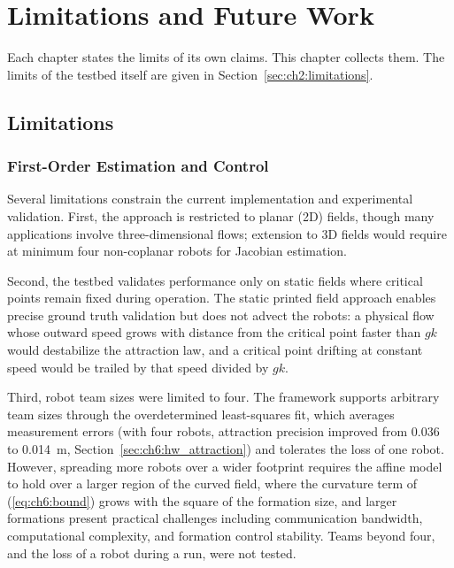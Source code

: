 \chapter{Limitations and Future Work}
\label{ch:limitations}

Each chapter states the limits of its own claims. This chapter collects
them. The limits of the testbed itself are given in
Section~\ref{sec:ch2:limitations}.

\section{Limitations}
\label{sec:ch9:limitations}

\subsection{First-Order Estimation and Control}
\label{sec:ch9:first_order}

Several limitations constrain the current implementation and experimental validation. First, the approach is restricted to planar (2D) fields, though many applications involve three-dimensional flows; extension to 3D fields would require at minimum four non-coplanar robots for Jacobian estimation.

Second, the testbed validates performance only on static fields where critical points remain fixed during operation. The static printed field approach enables precise ground truth validation but does not advect the robots: a physical flow whose outward speed grows with distance from the critical point faster than $gk$ would destabilize the attraction law, and a critical point drifting at constant speed would be trailed by that speed divided by $gk$.

Third, robot team sizes were limited to four. The framework supports arbitrary team sizes through the overdetermined least-squares fit, which averages measurement errors (with four robots, attraction precision improved from 0.036 to 0.014~m, Section~\ref{sec:ch6:hw_attraction}) and tolerates the loss of one robot. However, spreading more robots over a wider footprint requires the affine model to hold over a larger region of the curved field, where the curvature term of (\ref{eq:ch6:bound}) grows with the square of the formation size, and larger formations present practical challenges including communication bandwidth, computational complexity, and formation control stability. Teams beyond four, and the loss of a robot during a run, were not tested.

